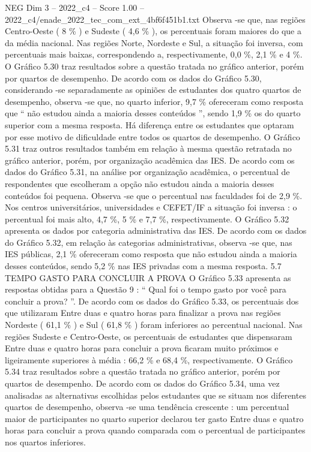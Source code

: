 \begin{textsample}{NEG Dim 3 – 2022\_c4 – Score 1.00 – 2022\_c4/enade\_2022\_tec\_com\_ext\_4bf6f451b1.txt}
Observa -se que, nas regiões Centro-Oeste ( 8 \% ) e Sudeste ( 4,6 \% ), os percentuais foram maiores do que a da média nacional.
Nas regiões Norte, Nordeste e Sul, a situação foi inversa, com percentuais mais baixas, correspondendo a, respectivamente, 0,0 \%, 2,1 \% e 4 \%.
O Gráfico 5.30 traz resultados sobre a questão tratada no gráfico anterior, porém por quartos de desempenho.
De acordo com os dados do Gráfico 5.30, considerando -se separadamente as opiniões de estudantes dos quatro quartos de desempenho, observa -se que, no quarto inferior, 9,7 \% ofereceram como resposta que “ não estudou ainda a maioria desses conteúdos ”, sendo 1,9 \% os do quarto superior com a mesma resposta.
Há diferença entre os estudantes que optaram por esse motivo de dificuldade entre todos os quartos de desempenho.
O Gráfico 5.31 traz outros resultados também em relação à mesma questão retratada no gráfico anterior, porém, por organização acadêmica das IES.
De acordo com os dados do Gráfico 5.31, na análise por organização acadêmica, o percentual de respondentes que escolheram a opção não estudou ainda a maioria desses conteúdos foi pequena.
Observa -se que o percentual nas faculdades foi de 2,9 \%.
Nos centros universitários, universidades e CEFET/IF a situação foi inversa : o percentual foi mais alto, 4,7 \%, 5 \% e 7,7 \%, respectivamente.
O Gráfico 5.32 apresenta os dados por categoria administrativa das IES.
De acordo com os dados do Gráfico 5.32, em relação às categorias administrativas, observa -se que, nas IES públicas, 2,1 \% ofereceram como resposta que não estudou ainda a maioria desses conteúdos, sendo 5,2 \% nas IES privadas com a mesma resposta. 5.7 TEMPO GASTO PARA CONCLUIR A PROVA O Gráfico 5.33 apresenta as respostas obtidas para a Questão 9 : “ Qual foi o tempo gasto por você para concluir a prova? ”.
De acordo com os dados do Gráfico 5.33, os percentuais dos que utilizaram Entre duas e quatro horas para finalizar a prova nas regiões Nordeste ( 61,1 \% ) e Sul ( 61,8 \% ) foram inferiores ao percentual nacional.
Nas regiões Sudeste e Centro-Oeste, os percentuais de estudantes que dispensaram Entre duas e quatro horas para concluir a prova ficaram muito próximos e ligeiramente superiores à média : 66,2 \% e 68,4 \%, respectivamente.
O Gráfico 5.34 traz resultados sobre a questão tratada no gráfico anterior, porém por quartos de desempenho.
De acordo com os dados do Gráfico 5.34, uma vez analisadas as alternativas escolhidas pelos estudantes que se situam nos diferentes quartos de desempenho, observa -se uma tendência crescente : um percentual maior de participantes no quarto superior declarou ter gasto Entre duas e quatro horas para concluir a prova quando comparada com o percentual de participantes nos quartos inferiores.

\end{textsample}
